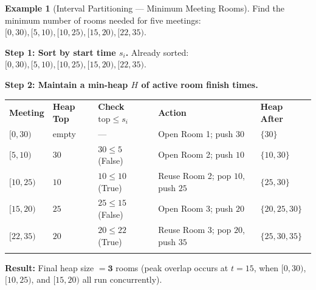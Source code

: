 \documentclass[11pt,a4paper]{article}
\theoremstyle{definition}
\newtheorem{example}{Example}[section]
\begin{document}
\begin{example}[Interval Partitioning --- Minimum Meeting Rooms]
Find the minimum number of rooms needed for five meetings: $[0, 30), [5, 10), [10, 25), [15, 20), [22, 35)$.

\textbf{Step 1: Sort by start time $s_i$.} Already sorted: $[0,30), [5,10), [10,25), [15,20), [22,35)$.

\textbf{Step 2: Maintain a min-heap $H$ of active room finish times.}

\begingroup\footnotesize{}
\begin{tabularx}{\textwidth}{>{\centering\arraybackslash}p{1.6cm} >{\centering\arraybackslash}p{2.0cm} >{\centering\arraybackslash}p{2.6cm} >{\raggedright\arraybackslash}X >{\centering\arraybackslash}p{2.2cm}}
\arrayrulecolor{primaryblue}\toprule[1.1pt]
\rowcolor{primaryblue!10}
\textcolor{primaryblue}{\textbf{Meeting}} & \textcolor{primaryblue}{\textbf{Heap Top}} & \textcolor{primaryblue}{\textbf{Check $\text{top} \le s_i$}} & \textcolor{primaryblue}{\textbf{Action}} & \textcolor{primaryblue}{\textbf{Heap After}} \\
\arrayrulecolor{codeframe}\midrule[0.6pt]
$[0, 30)$ & empty & --- & Open Room 1; push $30$ & $\{30\}$ \\
$[5, 10)$ & $30$ & $30 \le 5$ (False) & Open Room 2; push $10$ & $\{10, 30\}$ \\
$[10, 25)$ & $10$ & $10 \le 10$ (True) & Reuse Room 2; pop $10$, push $25$ & $\{25, 30\}$ \\
$[15, 20)$ & $25$ & $25 \le 15$ (False) & Open Room 3; push $20$ & $\{20, 25, 30\}$ \\
$[22, 35)$ & $20$ & $20 \le 22$ (True) & Reuse Room 3; pop $20$, push $35$ & $\{25, 30, 35\}$ \\
\arrayrulecolor{primaryblue}\bottomrule[1.1pt]
\end{tabularx}\endgroup

\textbf{Result:} Final heap size $= \mathbf{3}$ rooms (peak overlap occurs at $t = 15$, when $[0,30)$, $[10,25)$, and $[15,20)$ all run concurrently).
\end{example}
\end{document}
